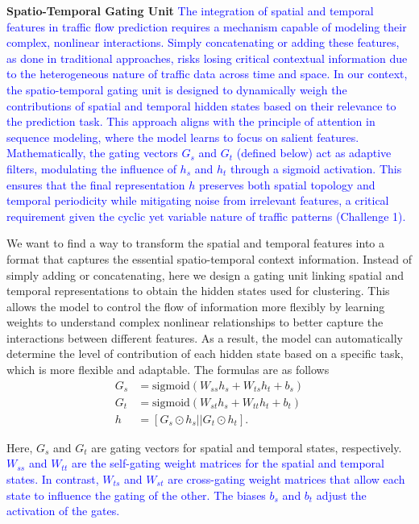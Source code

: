 \documentclass[lettersize,journal]{IEEEtran}
\begin{document}
\textbf{Spatio-Temporal Gating Unit} 
\textcolor{blue}{The integration of spatial and temporal features in traffic flow prediction requires a mechanism capable of modeling their complex, nonlinear interactions. Simply concatenating or adding these features, as done in traditional approaches, risks losing critical contextual information due to the heterogeneous nature of traffic data across time and space. In our context, the spatio-temporal gating unit is designed to dynamically weigh the contributions of spatial and temporal hidden states based on their relevance to the prediction task. This approach aligns with the principle of attention in sequence modeling, where the model learns to focus on salient features. Mathematically, the gating vectors $G_s$ and $G_t$ (defined below) act as adaptive filters, modulating the influence of $h_s$ and $h_t$ through a sigmoid activation. This ensures that the final representation $h$ preserves both spatial topology and temporal periodicity while mitigating noise from irrelevant features, a critical requirement given the cyclic yet variable nature of traffic patterns (Challenge 1).}

We want to find a way to transform the spatial and temporal features into a format that captures the essential spatio-temporal context information. Instead of simply adding or concatenating, here we design a gating unit linking spatial and temporal representations to obtain the hidden states used for clustering. This allows the model to control the flow of information more flexibly by learning weights to understand complex nonlinear relationships to better capture the interactions between different features. As a result, the model can automatically determine the level of contribution of each hidden state based on a specific task, which is more flexible and adaptable. The formulas are as follows
\begin{align}
    G_s &=  \text{sigmoid}(W_{ss}h_s+W_{ts}h_t+b_s)\\
    G_t &=  \text{sigmoid}(W_{st}h_s+W_{tt}h_t+b_t)\\
    h &=  [G_s \odot h_s || G_t \odot h_t].
    \label{equ:h}
\end{align}


Here, $G_s$ and $G_t$ are gating vectors for spatial and temporal states, respectively. \textcolor{blue}{$W_{ss}$ and $W_{tt}$ are the self-gating weight matrices for the spatial and temporal states. In contrast, $W_{ts}$ and $W_{st}$ are cross-gating weight matrices that allow each state to influence the gating of the other. The biases $b_s$ and $b_t$ adjust the activation of the gates.}
\end{document}
